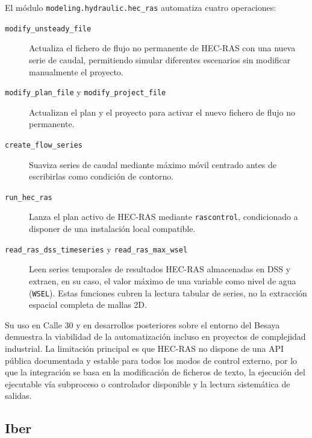 El módulo \texttt{modeling.hydraulic.hec\_ras} automatiza cuatro operaciones:
\begin{description}
  \item[\texttt{modify\_unsteady\_file}] Actualiza el fichero de flujo no permanente de HEC-RAS con una nueva serie de caudal, permitiendo simular diferentes escenarios sin modificar manualmente el proyecto.

  \item[\texttt{modify\_plan\_file} y \texttt{modify\_project\_file}] Actualizan el plan y el proyecto para activar el nuevo fichero de flujo no permanente.

  \item[\texttt{create\_flow\_series}] Suaviza series de caudal mediante máximo móvil centrado antes de escribirlas como condición de contorno.

  \item[\texttt{run\_hec\_ras}] Lanza el plan activo de HEC-RAS mediante \texttt{rascontrol}, condicionado a disponer de una instalación local compatible.

  \item[\texttt{read\_ras\_dss\_timeseries} y \texttt{read\_ras\_max\_wsel}] Leen series temporales de resultados HEC-RAS almacenadas en DSS y extraen, en su caso, el valor máximo de una variable como nivel de agua (\texttt{WSEL}). Estas funciones cubren la lectura tabular de series, no la extracción espacial completa de mallas 2D.
\end{description}

Su uso en Calle 30 \parencite{navas2024calle30} y en desarrollos posteriores sobre el entorno del Besaya demuestra la viabilidad de la automatización incluso en proyectos de complejidad industrial. La limitación principal es que HEC-RAS no dispone de una API pública documentada y estable para todos los modos de control externo, por lo que la integración se basa en la modificación de ficheros de texto, la ejecución del ejecutable vía subproceso o controlador disponible y la lectura sistemática de salidas.

\subsection{Iber}

